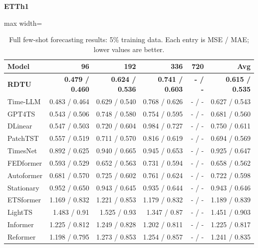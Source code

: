 \begin{table}[H]\centering\small
\caption{Full few-shot forecasting results: 5\% training data. Each entry is MSE / MAE; lower values are better.}\label{tab:few-shot-forecasting-5per-full}
\textbf{ETTh1}\par\smallskip
\begin{adjustbox}{max width=\linewidth}\begin{tabular}{lrrrrr}\toprule
\textbf{Model} & \textbf{96} & \textbf{192} & \textbf{336} & \textbf{720} & \textbf{Avg}\\\midrule
\rowcolor{blue!5}
\textbf{RDTU} & \textbf{0.479 / 0.460} & \textbf{0.624 / 0.536} & \textbf{0.741 / 0.603} & \textbf{- / -} & \textbf{0.615 / 0.535}\\
Time-LLM & 0.483 / 0.464 & 0.629 / 0.540 & 0.768 / 0.626 & - / - & 0.627 / 0.543\\
GPT4TS & 0.543 / 0.506 & 0.748 / 0.580 & 0.754 / 0.595 & - / - & 0.681 / 0.560\\
DLinear & 0.547 / 0.503 & 0.720 / 0.604 & 0.984 / 0.727 & - / - & 0.750 / 0.611\\
PatchTST & 0.557 / 0.519 & 0.711 / 0.570 & 0.816 / 0.619 & - / - & 0.694 / 0.569\\
TimesNet & 0.892 / 0.625 & 0.940 / 0.665 & 0.945 / 0.653 & - / - & 0.925 / 0.647\\
FEDformer & 0.593 / 0.529 & 0.652 / 0.563 & 0.731 / 0.594 & - / - & 0.658 / 0.562\\
Autoformer & 0.681 / 0.570 & 0.725 / 0.602 & 0.761 / 0.624 & - / - & 0.722 / 0.598\\
Stationary & 0.952 / 0.650 & 0.943 / 0.645 & 0.935 / 0.644 & - / - & 0.943 / 0.646\\
ETSformer & 1.169 / 0.832 & 1.221 / 0.853 & 1.179 / 0.832 & - / - & 1.189 / 0.839\\
LightTS & 1.483 / 0.91 & 1.525 / 0.93 & 1.347 / 0.87 & - / - & 1.451 / 0.903\\
Informer & 1.225 / 0.812 & 1.249 / 0.828 & 1.202 / 0.811 & - / - & 1.225 / 0.817\\
Reformer & 1.198 / 0.795 & 1.273 / 0.853 & 1.254 / 0.857 & - / - & 1.241 / 0.835\\
\bottomrule\end{tabular}\end{adjustbox}\end{table}
